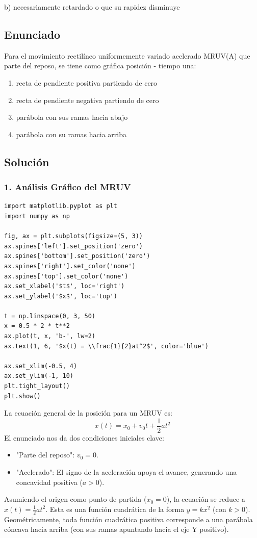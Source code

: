 \documentclass[12pt, a4paper]{article}
\begin{document}
\begin{tcolorbox}[colback=green!5!white, colframe=green!50!black, title=Respuesta Final]
\centering \Large b) necesariamente retardado o que su rapidez disminuye
\end{tcolorbox}

\newpage

\subsection*{Enunciado}
Para el movimiento rectilíneo uniformemente variado acelerado MRUV(A) que parte del reposo, se tiene como gráfica posición - tiempo una:
\begin{enumerate}[label=\alph*)]
    \item recta de pendiente positiva partiendo de cero
    \item recta de pendiente negativa partiendo de cero
    \item parábola con sus ramas hacia abajo
    \item parábola con su ramas hacia arriba
\end{enumerate}

\subsection*{Solución}

\subsubsection*{1. Análisis Gráfico del MRUV}

\begin{lstlisting}
import matplotlib.pyplot as plt
import numpy as np

fig, ax = plt.subplots(figsize=(5, 3))
ax.spines['left'].set_position('zero')
ax.spines['bottom'].set_position('zero')
ax.spines['right'].set_color('none')
ax.spines['top'].set_color('none')
ax.set_xlabel('$t$', loc='right')
ax.set_ylabel('$x$', loc='top')

t = np.linspace(0, 3, 50)
x = 0.5 * 2 * t**2
ax.plot(t, x, 'b-', lw=2)
ax.text(1, 6, '$x(t) = \\frac{1}{2}at^2$', color='blue')

ax.set_xlim(-0.5, 4)
ax.set_ylim(-1, 10)
plt.tight_layout()
plt.show()
\end{lstlisting}

La ecuación general de la posición para un MRUV es:
$$ x(t) = x_0 + v_0 t + \frac{1}{2} a t^2 $$
El enunciado nos da dos condiciones iniciales clave:
\begin{itemize}
    \item "Parte del reposo": $v_0 = 0$.
    \item "Acelerado": El signo de la aceleración apoya el avance, generando una concavidad positiva ($a > 0$).
\end{itemize}
Asumiendo el origen como punto de partida ($x_0 = 0$), la ecuación se reduce a $x(t) = \frac{1}{2} a t^2$.
Esta es una función cuadrática de la forma $y = kx^2$ (con $k > 0$). Geométricamente, toda función cuadrática positiva corresponde a una parábola cóncava hacia arriba (con sus ramas apuntando hacia el eje Y positivo).
\end{document}
